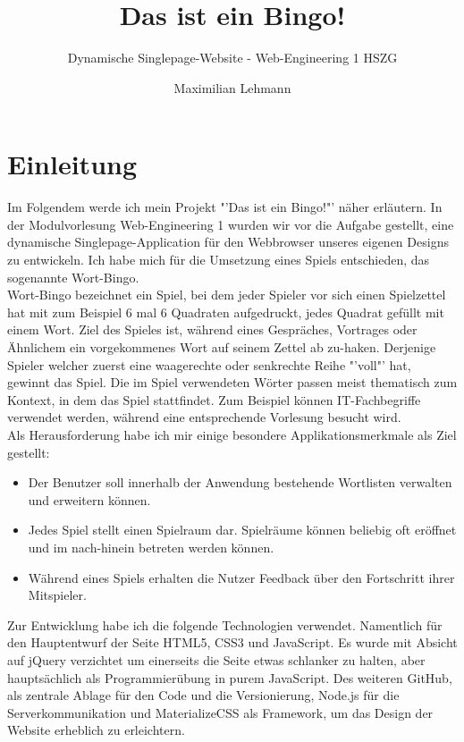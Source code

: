 \documentclass[12pt]{scrartcl}
\title{Das ist ein Bingo!}
\subtitle{Dynamische Singlepage-Website - Web-Engineering 1 HSZG}
\author{Maximilian Lehmann}
\date{}
\begin{document}
\maketitle
\thispagestyle{empty}

\newpage
\thispagestyle{empty}
\tableofcontents
\newpage

\section{Einleitung}

	Im Folgendem werde ich mein Projekt "'Das ist ein Bingo!"' näher erläutern. In der Modulvorlesung Web-Engineering 1 wurden wir vor die Aufgabe gestellt, eine dynamische Singlepage-Application für den Webbrowser unseres eigenen Designs zu entwickeln. Ich habe mich für die Umsetzung eines Spiels entschieden, das sogenannte Wort-Bingo.\\
	
	Wort-Bingo bezeichnet ein Spiel, bei dem jeder Spieler vor sich einen Spielzettel hat mit zum Beispiel 6 mal 6 Quadraten aufgedruckt, jedes Quadrat gefüllt mit einem Wort. Ziel des Spieles ist, während eines Gespräches, Vortrages oder Ähnlichem ein vorgekommenes Wort auf seinem Zettel ab zu-haken. Derjenige Spieler welcher zuerst eine waagerechte oder senkrechte Reihe "'voll"' hat, gewinnt das Spiel. Die im Spiel verwendeten Wörter passen meist thematisch zum Kontext, in dem das Spiel stattfindet. Zum Beispiel können IT-Fachbegriffe verwendet werden, während eine entsprechende Vorlesung besucht wird.\\
	
	Als Herausforderung habe ich mir einige besondere Applikationsmerkmale als Ziel gestellt:
	\begin{itemize}
		\item Der Benutzer soll innerhalb der Anwendung bestehende Wortlisten verwalten und erweitern können.
		\item Jedes Spiel stellt einen Spielraum dar. Spielräume können beliebig oft eröffnet und im nach-hinein betreten werden können.
		\item Während eines Spiels erhalten die Nutzer Feedback über den Fortschritt ihrer Mitspieler.
	\end{itemize}
		
	Zur Entwicklung habe ich die folgende Technologien verwendet. Namentlich für den Hauptentwurf der Seite HTML5, CSS3 und JavaScript. Es wurde mit Absicht auf jQuery verzichtet um einerseits die Seite etwas schlanker zu halten, aber hauptsächlich als Programmierübung in purem JavaScript. Des weiteren GitHub, als zentrale Ablage für den Code und die Versionierung, Node.js für die Serverkommunikation und MaterializeCSS als Framework, um das Design der Website erheblich zu erleichtern.\\
	
\end{document}
